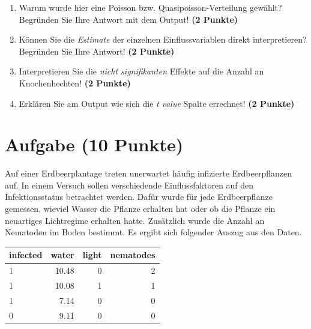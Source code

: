 \documentclass[a4paper, 10pt]{scrartcl}\usepackage[]{graphicx}\usepackage[]{xcolor}
\newenvironment{knitrout}{}{} %
\begin{document}
\begin{enumerate}
\item Warum wurde hier eine Poisson bzw. Quasipoisson-Verteilung gew{\"a}hlt?
  Begr{\"u}nden Sie Ihre Antwort mit dem \Rlogo Output! \textbf{(2 Punkte)}
\item K{\"o}nnen Sie die \textit{Estimate} der einzelnen Einflussvariablen
  direkt interpretieren? Begr{\"u}nden Sie Ihre Antwort! \textbf{(2 Punkte)}
\item Interpretieren Sie die \textit{nicht
      signifikanten} Effekte auf die Anzahl an Knochenhechten! \textbf{(2 Punkte)}
\item Erkl{\"a}ren Sie am \Rlogo Output wie sich die \textit{t value} Spalte
  errechnet! \textbf{(2 Punkte)}
\end{enumerate}
 
\clearpage

\section{Aufgabe \hfill (10 Punkte)}



Auf einer Erdbeerplantage treten unerwartet h{\"a}ufig infizierte
Erdbeerpflanzen auf. In einem Versuch sollen verschiedende Einflussfaktoren
auf den Infektionsstatus betrachtet werden. Daf{\"u}r wurde f{\"u}r jede
Erdbeerpflanze gemessen, wieviel Wasser die Pflanze erhalten hat oder ob
die Pflanze ein neuartiges Lichtregime erhalten hatte. Zus{\"a}tzlich wurde die
Anzahl an Nematoden im Boden bestimmt. Es ergibt sich folgender Auszug aus
den Daten.

\begin{knitrout}
\color{fgcolor}\begin{table}[!h]
\centering
\begin{tabular}{lrrr}
\toprule
infected & water & light & nematodes\\
\midrule
1 & 10.48 & 0 & 2\\
1 & 10.08 & 1 & 1\\
1 & 7.14 & 0 & 0\\
0 & 9.11 & 0 & 0\\
\bottomrule
\end{tabular}
\end{table}

\end{knitrout}
\end{document}
